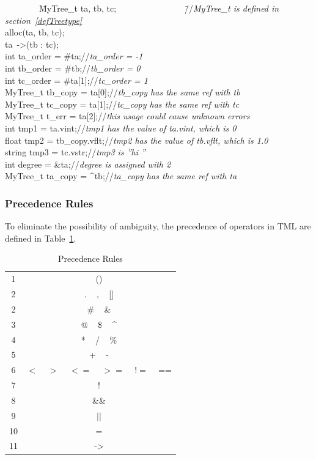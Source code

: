\documentclass[12pt,psfig,a4]{article}
\begin{document}
\begin{itemize}
\begin{code}
\begin{tabbing}
~~~~~~~~\= MyTree\_t ta, tb, tc;~~~~~~~~~~~~~~~~\=//\textit{MyTree\_t is defined in section~\ref{defTreetype}}\\
\> alloc(ta, tb, tc);\\
\> ta~-\textgreater(tb : tc);\\
\> int ta\_order = \#ta;\>//\textit{ta\_order = -1}\\
\> int tb\_order = \#tb;\>//\textit{tb\_order = 0}\\
\> int tc\_order = \#ta[1];\>//\textit{tc\_order = 1}\\
\> MyTree\_t tb\_copy = ta[0];\>//\textit{tb\_copy has the same ref with tb}\\
\> MyTree\_t tc\_copy = ta[1];\>//\textit{tc\_copy has the same ref with tc}\\
\> MyTree\_t t\_err = ta[2];\>//\textit{this usage could cause unknown errors}\\
\> int tmp1 = ta.vint;\>//\textit{tmp1 has the value of ta.vint, which is 0}\\
\> float tmp2 = tb\_copy.vflt;\>//\textit{tmp2 has the value of tb.vflt, which is 1.0}\\
\> string tmp3 = tc.vstr;\>//\textit{tmp3 is ''hi ''}\\
\> int degree = \&ta;\>//\textit{degree is assigned with 2}\\
\> MyTree\_t ta\_copy = \^{}tb;\>//\textit{ta\_copy has the same ref with ta}
\end{tabbing}
\end{code}

\end{itemize}


\subsubsection{Precedence Rules}
To eliminate the possibility of ambiguity, the precedence of operators in TML are defined in Table~\ref{preRule}.

\begin{table}[ht]
\begin{center}
\begin{tabular}{| c | c |}
\hline
1 & () \\
2 & . ~ , ~ [] \\
2 & \# ~ \& \\
3 & @ ~ \$ ~ \^{} \\
4 & * ~ / ~ \% \\
5 & + ~ - \\
6 & $<$ ~ $>$ ~ $<=$ ~ $>=$ ~ $!=$ ~ == \\
7 & ! \\
8 & \&\& \\
9 & $||$ \\
10 & =\\%
11 & -\textgreater \\
\hline
\end{tabular}
\caption{Precedence Rules}
\label{preRule}
\end {center}
\end{table}
\end{document}
